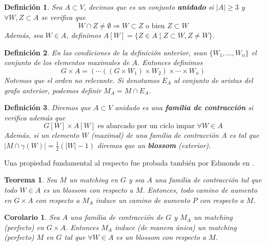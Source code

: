 \documentclass[twoside,a4paper,openright,12pt]{book}
\newtheorem{defi}{Definici\'on}[section]
\newtheorem{thm}{Teorema}[section]
\newtheorem{cor}{Corolario}[section]
\begin{document}
\begin{defi}
Sea $A\subset V$, decimos que es un conjunto \textbf{anidado} si $|A|\geq 3$ y $\forall W,Z\subset A$ se verifica que 
$$
W\cap Z \neq \emptyset \Rightarrow W\subset Z \text{ o bien } Z\subset W
$$
Además, sea $W \in A$, definimos $A[W] =\{Z\in A \mid Z\subset W, Z\neq W\}$.
\end{defi}
\begin{defi}
En las condiciones de la definición anterior, sean $\{W_1,\dotsc,W_n\}$ el conjunto de los elementos maximales de $A$. Entonces definimos
$$
G\times A = (\cdots((G\times W_1)\times W_2)\times \cdots \times W_n)
$$
Notemos que el orden no relevante. Si denotamos $E_A$ al conjunto de aristas del grafo anterior, podemos definir $M_A = M\cap E_A$. 
\end{defi}
\begin{defi}
Diremos que $A \subset V$ anidado es una \textbf{familia de contracción} si verifica además que
$$
G[W]\times A[W] \text{ es abarcado por un ciclo impar $\forall W \in A$}
$$ 
Además, si un elemento $W$ (maximal) de una familia de contracción $A$ es tal que $|M\cap\gamma(W)| = \frac{1}{2}(|W|-1)$ diremos que un \textbf{blossom} (exterior).
\end{defi}
Una propiedad fundamental al respecto fue probada también por Edmonds en \cite{edmon2}.
\begin{thm}
Sea $M$ un matching en $G$ y sea $A$ una familia de contracción tal que todo $W\in A$ es un blossom con respecto a $M$. Entonces, todo camino de aumento en $G\times A$ con respecto a $M_A$ induce un camino de aumento $P$ con respecto a $M$.
\end{thm}
\begin{cor}
Sea $A$ una familia de contracción de $G$ y $M_A$ un matching (perfecto) en $G\times A$. Entonces $M_A$ induce (de manera única) un matching (perfecto) $M$ en $G$ tal que $\forall W\in A$ es un blossom con respecto a $M$.
\end{cor}
\end{document}
